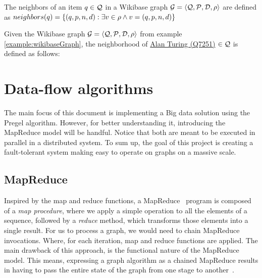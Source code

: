 \begin{definition}
    \label{definition:neighborhood}
    The neighbors of an item $q\in\mathcal{Q}$ in a Wikibase graph $\mathcal{G}=\langle\mathcal{Q},\mathcal{P},\mathcal{D},\rho\rangle$ are defined as $neighbors(q)=\{(q,p,n,d): \exists{}v\in\rho \wedge v=(q,p,n,d)\}$
\end{definition}

\begin{example}
    Given the Wikibase graph $\mathcal{G}=\langle\mathcal{Q},\mathcal{P},\mathcal{D},\rho\rangle$ from example \ref{example:wikibaseGraph}, the neighborhood of \href{https://www.wikidata.org/wiki/Q7251}{Alan Turing (Q7251)} $\in \mathcal{Q}$ is defined as follows:
\end{example}

\begin{table}[ht]
    \centering
    
\end{table}

\section{Data-flow algorithms} %

The main focus of this document is implementing a Big data solution using the Pregel algorithm. However, for better understanding it, introducing the MapReduce model will be handful. Notice that both are meant to be executed in parallel in a distributed system. To sum up, the goal of this project is creating a fault-tolerant system making easy to operate on graphs on a massive scale.

\subsection{MapReduce}
\label{section:mapReduce}

Inspired by the map and reduce functions, a MapReduce~\cite{wiki:MapReduce} program is composed of a \textit{map procedure}, where we apply a simple operation to all the elements of a sequence, followed by a \textit{reduce} method, which transforms those elements into a single result. For us to process a graph, we would need to chain MapReduce invocations. Where, for each iteration, map and reduce functions are applied. The main drawback of this approach, is the functional nature of the MapReduce model. This means, expressing a graph algorithm as a chained MapReduce results in having to pass the entire state of the graph from one stage to another~\cite{10.1145/1807167.1807184}.

